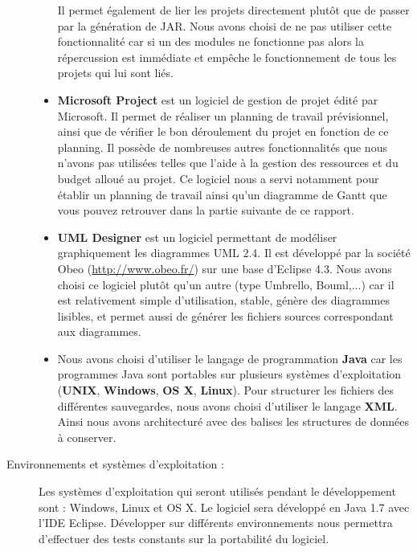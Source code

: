\begin{description}
\begin{itemize}
Il permet également de lier les projets directement plutôt que de passer par la génération de JAR. Nous avons choisi de ne pas utiliser cette fonctionnalité car si un des modules ne fonctionne pas alors la répercussion est immédiate et empêche le fonctionnement de tous les projets qui lui sont liés.\\

\item \textbf{Microsoft Project} est un logiciel de gestion de projet édité par Microsoft. Il permet de réaliser un planning de travail prévisionnel, ainsi que de vérifier le bon déroulement du projet en fonction de ce planning. Il possède de nombreuses autres fonctionnalités que nous n’avons pas utilisées telles que l’aide à la gestion des ressources et du budget alloué au projet. Ce logiciel nous a servi notamment pour établir un planning de travail ainsi qu’un diagramme de Gantt que vous pouvez retrouver dans la partie suivante de ce rapport.\\

\item \textbf{UML Designer} est un logiciel permettant de modéliser graphiquement les diagrammes UML 2.4. Il est développé par la société Obeo (\url{http://www.obeo.fr/}) sur une base d’Eclipse 4.3. Nous avons choisi ce logiciel plutôt qu’un autre (type Umbrello, Bouml,...) car il est relativement simple d’utilisation, stable, génère des diagrammes lisibles, et permet aussi de générer les fichiers sources correspondant aux diagrammes.\\

\item Nous avons choisi d'utiliser le langage de programmation \textbf{Java} car les programmes Java sont portables sur plusieurs systèmes d’exploitation (\textbf{UNIX}, \textbf{Windows}, \textbf{OS X}, \textbf{Linux}). Pour structurer les fichiers des différentes sauvegardes, nous avons choisi d’utiliser le langage \textbf{XML}. Ainsi nous avons architecturé avec des balises les structures de données à conserver.\\
\end{itemize}

\item [Environnements et systèmes d’exploitation :]
Les systèmes d’exploitation qui seront utilisés pendant le développement sont : Windows, Linux et OS X. Le logiciel sera développé en Java 1.7 avec l’IDE Eclipse. Développer sur différents environnements nous permettra d'effectuer des tests constants sur la portabilité du logiciel.

\end{description}

